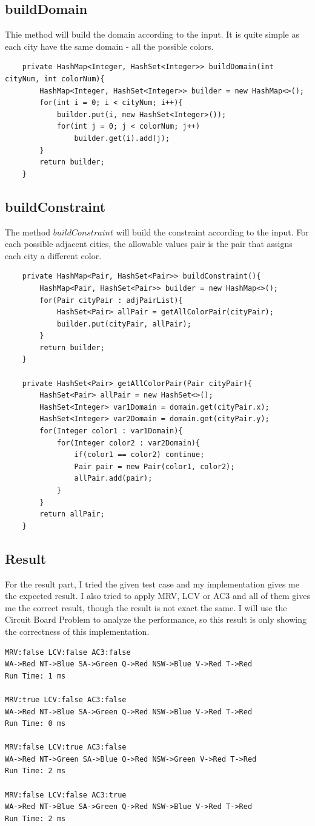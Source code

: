 \documentclass{article}
\begin{document}
\subsection{buildDomain}
Thie method will build the domain according to the input. It is quite simple as each city have the same domain - all the possible colors.
\begin{lstlisting}
	private HashMap<Integer, HashSet<Integer>> buildDomain(int cityNum, int colorNum){
		HashMap<Integer, HashSet<Integer>> builder = new HashMap<>();
		for(int i = 0; i < cityNum; i++){
			builder.put(i, new HashSet<Integer>());
			for(int j = 0; j < colorNum; j++)
				builder.get(i).add(j);
		}
		return builder;
	}
\end{lstlisting}

\subsection{buildConstraint}
The method $buildConstraint$ will build the constraint according to the input. For each possible adjacent cities, the allowable values pair is the pair that assigns each city a different color.
\begin{lstlisting}
	private HashMap<Pair, HashSet<Pair>> buildConstraint(){
		HashMap<Pair, HashSet<Pair>> builder = new HashMap<>();
		for(Pair cityPair : adjPairList){
			HashSet<Pair> allPair = getAllColorPair(cityPair);
			builder.put(cityPair, allPair);
		}
		return builder;
	}
	
	private HashSet<Pair> getAllColorPair(Pair cityPair){
		HashSet<Pair> allPair = new HashSet<>();
		HashSet<Integer> var1Domain = domain.get(cityPair.x);
		HashSet<Integer> var2Domain = domain.get(cityPair.y);
		for(Integer color1 : var1Domain){
			for(Integer color2 : var2Domain){
				if(color1 == color2) continue;
				Pair pair = new Pair(color1, color2);
				allPair.add(pair);
			}
		}
		return allPair;
	}
\end{lstlisting}

\subsection{Result}
For the result part, I tried the given test case and my implementation gives me the expected result. I also tried to apply MRV, LCV or AC3 and all of them gives me the correct result, though the result is not exact the same. I will use the Circuit Board Problem to analyze the performance, so this result is only showing the correctness of this implementation.
\begin{lstlisting}
MRV:false LCV:false AC3:false
WA->Red NT->Blue SA->Green Q->Red NSW->Blue V->Red T->Red 
Run Time: 1 ms

MRV:true LCV:false AC3:false
WA->Red NT->Blue SA->Green Q->Red NSW->Blue V->Red T->Red 
Run Time: 0 ms

MRV:false LCV:true AC3:false
WA->Red NT->Green SA->Blue Q->Red NSW->Green V->Red T->Red 
Run Time: 2 ms

MRV:false LCV:false AC3:true
WA->Red NT->Blue SA->Green Q->Red NSW->Blue V->Red T->Red 
Run Time: 2 ms

\end{lstlisting}
\end{document}
